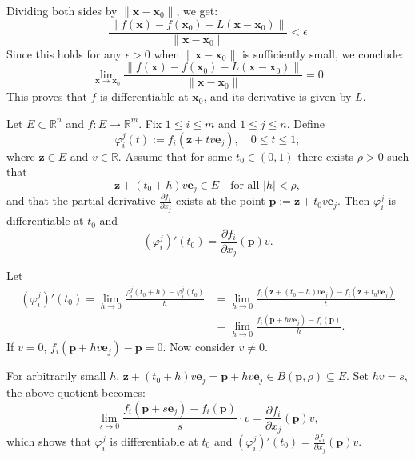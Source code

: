 \begin{pfbox}
Dividing both sides by $\|\mathbf{x} - \mathbf{x}_0\|$, we get:
$$\frac{\|f(\mathbf{x}) - f(\mathbf{x}_0) - L(\mathbf{x} - \mathbf{x}_0)\|}{\|\mathbf{x} - \mathbf{x}_0\|} < \epsilon$$
Since this holds for any $\epsilon > 0$ when $\|\mathbf{x} - \mathbf{x}_0\|$ is sufficiently small, we conclude:
$$\lim_{\mathbf{x} \to \mathbf{x}_0} \frac{\|f(\mathbf{x}) - f(\mathbf{x}_0) - L(\mathbf{x} - \mathbf{x}_0)\|}{\|\mathbf{x} - \mathbf{x}_0\|} = 0$$
This proves that $f$ is differentiable at $\mathbf{x}_0$, and its derivative is given by $L$.

\end{pfbox}

\begin{lemma}
Let $E \subset \mathbb{R}^n$ and $f: E \to \mathbb{R}^m$. Fix $1 \le i \le m$ and $1 \le j \le n$. Define
$$ \varphi_i^j(t) := f_i(\mathbf{z} + t v \mathbf{e}_j), \quad 0 \le t \le 1, $$
where $\mathbf{z} \in E$ and $v \in \mathbb{R}$. Assume that for some $t_0 \in (0, 1)$ there exists $\rho > 0$ such that
$$ \mathbf{z} + (t_0 + h)v \mathbf{e}_j \in E \quad \text{for all } |h| < \rho, $$
and that the partial derivative $\frac{\partial f_i}{\partial x_j}$ exists at the point $\mathbf{p} := \mathbf{z} + t_0 v \mathbf{e}_j$. Then $\varphi_i^j$ is differentiable at $t_0$ and
$$ (\varphi_i^j)'(t_0) = \frac{\partial f_i}{\partial x_j}(\mathbf{p}) v. $$
\label{coordinate chain rule}
\end{lemma}


\begin{pfbox}

Let 
\begin{align*}
(\varphi_i^j)'(t_0) = \lim_{h\to 0}\frac{\varphi_i^j(t_0+h)-\varphi_i^j(t_0)}{h}
&=\lim_{h\to 0}\frac{f_i(\mathbf{z} + (t_0+h) v \mathbf{e}_j)-f_i(\mathbf{z} + t_0 v \mathbf{e}_j)}{t}\\
&=\lim_{h\to 0}\frac{f_i(\mathbf{p}+hv\mathbf{e}_j)-f_i(\mathbf{p})}{h}.
\end{align*}
If $v=0$, $f_i(\mathbf{p}+hv\mathbf{e}_j)-\mathbf{p}=0.$
Now consider $v\ne 0$. 

For arbitrarily small $h$, $\mathbf{z} + (t_0 + h)v \mathbf{e}_j=\mathbf{p}+hv\mathbf{e}_j\in B(\mathbf{p},\rho)\subseteq E.$ 
Set $hv=s$, the above quotient becomes:
\[\lim_{s\to 0}\frac{f_i(\mathbf{p}+s\mathbf{e}_j)-f_i(\mathbf{p})}{s}\cdot v = \frac{\partial f_i}{\partial x_j}(\mathbf{p})v,\]
which shows that $\varphi_i^j$ is differentiable at $t_0$ and
$(\varphi_i^j)'(t_0) = \frac{\partial f_i}{\partial x_j}(\mathbf{p}) v.$

\end{pfbox}



